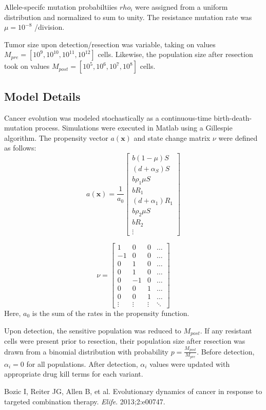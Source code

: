 \documentclass{article}
\begin{document}
Allele-specifc mutation probabiltiies $rho_i$ were assigned from a uniform distribution and normalized to sum to unity.  The resistance mutation rate was $\mu=10^{-8}$ /division.

Tumor size upon detection/resection was variable, taking on values $M_{pre} = [10^9, 10^{10}, 10^{11}, 10^{12}]$ cells.  Likewise, the population size after resection took on values $M_{post} = [10^5, 10^6, 10^7, 10^8]$ cells.

\subsection{Model Details}
Cancer evolution was modeled stochastically as a continuous-time birth-death-mutation process.  Simulations were executed in Matlab using a Gillespie algorithm.  The propensity vector $a(\mathbf{x})$ and state change matrix $\nu$ were defined as follows:
\begin{equation}
a(\mathbf{x}) = \frac{1}{a_0}
\begin{bmatrix}
b (1-\mu) S \\
(d+\alpha_S) S \\
b \rho_1 \mu S \\
b R_1 \\
(d + \alpha_1) R_1 \\
b \rho_2 \mu S \\
b R_2 \\
\vdots
\end{bmatrix}
\end{equation}

\begin{equation}
\nu = 
\begin{bmatrix}
1 & 0 & 0 & \dots \\
-1 & 0 & 0 & \dots \\
0 & 1 & 0 & \dots \\
0 & 1 & 0 & \dots \\
0 & -1 & 0 & \dots \\
0 & 0 & 1 & \dots \\
0 & 0 & 1 & \dots \\
\vdots & \vdots & \vdots & \ddots
\end{bmatrix}
\end{equation}
Here, $a_0$ is the sum of the rates in the propensity function.

Upon detection, the sensitive population was reduced to $M_{post}$.  If any resistant cells were present prior to resection, their population size after resection was drawn from a binomial distribution with probability $p=\frac{M_{post}}{M_{pre}}$.  Before detection, $\alpha_i = 0$ for all populations.  After detection, $\alpha_i$ values were updated with appropriate drug kill terms for each variant.

\begin{thebibliography}{9}

Bozic I, Reiter JG, Allen B, et al. Evolutionary dynamics of cancer in response to targeted combination therapy. \textit{Elife}. 2013;2:e00747.

\end{thebibliography}
\end{document}
